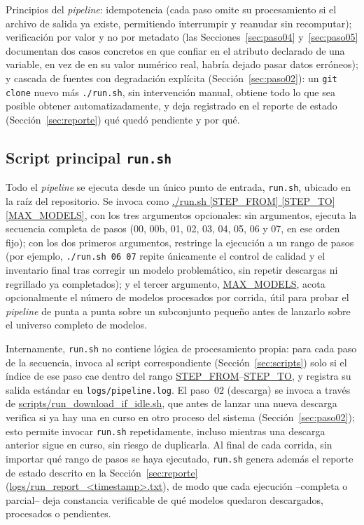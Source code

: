 \documentclass[11pt,a4paper]{article}
\newcommand{\archivo}[1]{\begingroup\hypersetup{urlcolor=black}\url{#1}\endgroup}
\begin{document}
Principios del \emph{pipeline}: idempotencia (cada paso omite su procesamiento si el archivo de salida ya existe, permitiendo interrumpir y reanudar sin recomputar); verificaci\'on por valor y no por metadato (las Secciones~\ref{sec:paso04} y~\ref{sec:paso05} documentan dos casos concretos en que confiar en el atributo declarado de una variable, en vez de en su valor num\'erico real, habr\'ia dejado pasar datos err\'oneos); y cascada de fuentes con degradaci\'on expl\'icita (Secci\'on~\ref{sec:paso02}): un \texttt{git clone} nuevo m\'as \texttt{./run.sh}, sin intervenci\'on manual, obtiene todo lo que sea posible obtener automatizadamente, y deja registrado en el reporte de estado (Secci\'on~\ref{sec:reporte}) qu\'e qued\'o pendiente y por qu\'e.

\subsection{Script principal \texttt{run.sh}}
\label{sec:runsh}

Todo el \emph{pipeline} se ejecuta desde un \'unico punto de entrada, \texttt{run.sh}, ubicado en la ra\'iz del repositorio. Se invoca como \archivo{./run.sh [STEP_FROM] [STEP_TO] [MAX_MODELS]}, con los tres argumentos opcionales: sin argumentos, ejecuta la secuencia completa de pasos (00, 00b, 01, 02, 03, 04, 05, 06 y 07, en ese orden fijo); con los dos primeros argumentos, restringe la ejecuci\'on a un rango de pasos (por ejemplo, \texttt{./run.sh 06 07} repite \'unicamente el control de calidad y el inventario final tras corregir un modelo problem\'atico, sin repetir descargas ni regrillado ya completados); y el tercer argumento, \archivo{MAX_MODELS}, acota opcionalmente el n\'umero de modelos procesados por corrida, \'util para probar el \emph{pipeline} de punta a punta sobre un subconjunto peque\~no antes de lanzarlo sobre el universo completo de modelos.

Internamente, \texttt{run.sh} no contiene l\'ogica de procesamiento propia: para cada paso de la secuencia, invoca al script correspondiente (Secci\'on~\ref{sec:scripts}) solo si el \'indice de ese paso cae dentro del rango \archivo{STEP_FROM}--\archivo{STEP_TO}, y registra su salida est\'andar en \texttt{logs/pipeline.log}. El paso~02 (descarga) se invoca a trav\'es de \archivo{scripts/run_download_if_idle.sh}, que antes de lanzar una nueva descarga verifica si ya hay una en curso en otro proceso del sistema (Secci\'on~\ref{sec:paso02}); esto permite invocar \texttt{run.sh} repetidamente, incluso mientras una descarga anterior sigue en curso, sin riesgo de duplicarla. Al final de cada corrida, sin importar qu\'e rango de pasos se haya ejecutado, \texttt{run.sh} genera adem\'as el reporte de estado descrito en la Secci\'on~\ref{sec:reporte} (\archivo{logs/run_report_<timestamp>.txt}), de modo que cada ejecuci\'on --completa o parcial-- deja constancia verificable de qu\'e modelos quedaron descargados, procesados o pendientes.
\end{document}
